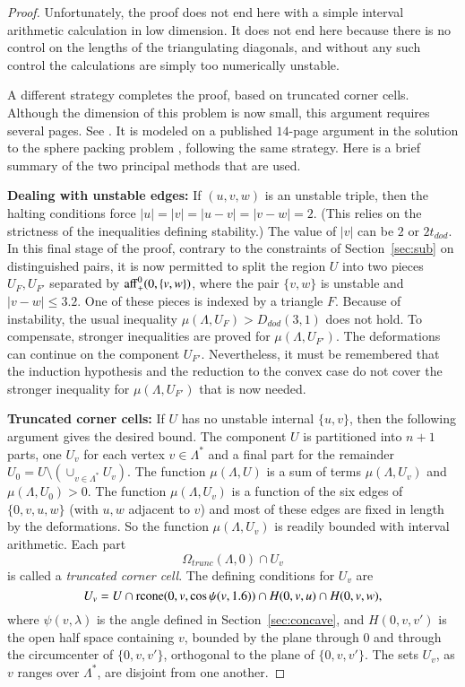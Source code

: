 \documentclass{article} %
\begin{document}
\begin{proof}
Unfortunately, the proof does not end here with a simple interval
arithmetic calculation in low dimension.  It does not end
here because there is no control on the
lengths of the triangulating diagonals, and without any such
control the calculations are simply too numerically unstable.


A different strategy completes the proof, based on truncated
corner cells.  Although the dimension of this problem is now small,
this argument requires several pages.
See \cite[pp.30-38]{arx}.  It is modeled on a published
$14$-page argument in the solution to the sphere packing problem
\cite[\S\S13.2-13.11]{DCG}, following the same strategy.
Here is a brief summary of the two principal  methods that are used.

\textbf {Dealing with unstable edges:}  
If $(u,v,w)$ is an unstable triple, then the
halting conditions force $|u|=|v|=|u-v|=|v-w|=2$.  (This
relies on the strictness of the inequalities defining stability.)
The value of $|v|$ can be $2$ or $2t_{dod}$. In this final
stage of the proof, contrary to the constraints of Section~\ref{sec:sub}
on distinguished pairs,
it is now permitted to split the region $U$ into two pieces
$U_F,U_{F'}$ separated by ${\operatorname{aff}}_+^0(0,\{v,w\})$, where
the pair $\{v,w\}$ is unstable and $|v-w|\le 3.2$.  
One of these pieces is indexed
by a triangle $F$.  Because of instability, the usual inequality
$\mu(\Lambda,U_F)> D_{dod}(3,1)$ does not hold.  To compensate,
stronger inequalities are proved for $\mu(\Lambda,U_{F'})$.
The deformations can continue on the component $U_{F'}$. Nevertheless,
it must be remembered that the induction hypothesis and the 
reduction to the convex case do not cover the stronger 
inequality for $\mu(\Lambda,U_{F'})$ that is now needed.

\textbf {Truncated corner cells:}  If $U$ has no unstable
internal $\{u,v\}$, then the following argument gives the
desired bound.  The component $U$ is partitioned into $n+1$
parts, one $U_v$ for each vertex $v\in\Lambda^*$ and a final part
for the remainder $U_0 = U\setminus(\cup_{v\in\Lambda^*} U_v)$.
The function $\mu(\Lambda,U)$ is a sum of terms $\mu(\Lambda,U_v)$
and $\mu(\Lambda,U_0) >0$.  The function $\mu(\Lambda,U_v)$
is a function of the six edges of $\{0,v,u,w\}$ (with $u,w$
adjacent to $v$) and most of these edges are fixed in length
by the deformations.  So the function $\mu(\Lambda,U_v)$
is readily bounded with interval arithmetic.  Each part
$$\Omega_{trunc}(\Lambda,0)\cap U_v$$
is called a {\it truncated corner cell}.  The defining conditions
for $U_v$ are
  $$
  U_v = U \cap {\operatorname{rcone}}(0,v,\cos\psi(v,1.6)) \cap H(0,v,u) \cap H(0,v,w),
  $$
where $\psi(v,\lambda)$ is the angle defined in Section~\ref{sec:concave},
and $H(0,v,v')$ is the open half space containing $v$, bounded by
the plane through $0$ and through the circumcenter
of $\{0,v,v'\}$, orthogonal to the plane of $\{0,v,v'\}$.  The
sets $U_v$, as $v$ ranges over $\Lambda^*$, are disjoint from one
another.



\end{proof}
\end{document}
